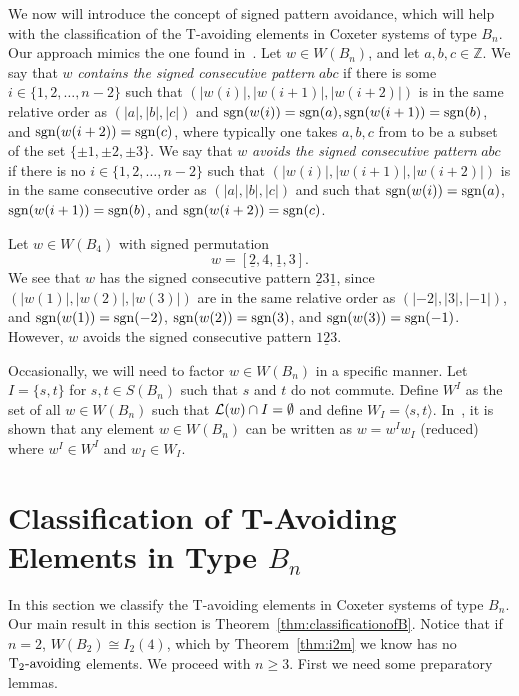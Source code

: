 We now will introduce the concept of signed pattern avoidance, which will help with the classification of the T-avoiding elements in Coxeter systems of type $B_n$. Our approach mimics the one found in~\cite{Gern2013a}. Let $w \in W(B_n)$, and let $a,b,c \in \mathbb{Z}$. We say that $w$ \emph{contains the signed consecutive pattern} $abc$ if there is some $i \in \{1,2, \ldots, n-2\}$ such that $(|w(i)|,|w(i+1)|,|w(i+2)|)$ is in the same relative order as $(|a|,|b|,|c|)$ and $\mathrm{sgn}(w(i))=\mathrm{sgn}(a), \mathrm{sgn}(w(i+1))=\mathrm{sgn}(b)$, and $\mathrm{sgn}(w(i+2))=\mathrm{sgn}(c)$, where typically one takes $a,b,c$ from to be a subset of the set $\{\pm1,\pm2,\pm3\}$. We say that $w$ \emph{avoids the signed consecutive pattern} $abc$ if there is no $i \in \{1,2, \ldots, n-2\}$ such that $\left(|w(i)|, |w(i+1)|, |w(i+2)|\right)$ is in the same consecutive order as $\left(|a|, |b|, |c| \right)$ and such that $\mathrm{sgn}(w(i))=\mathrm{sgn}(a)$, $\mathrm{sgn}(w(i+1))=\mathrm{sgn}(b)$, and $\mathrm{sgn}(w(i+2))=\mathrm{sgn}(c)$.

\begin{example}
Let $w \in W(B_4)$ with signed permutation \[w=[\underline{2},4, \underline{1}, 3].\] We see that $w$ has the signed consecutive pattern $\underline{2} 3 \underline{1}$, since $(|w(1)|, |w(2)|, |w(3)|)$ are in the same relative order as $(|-2|, |3|, |-1|)$, and $\mathrm{sgn}(w(1))=\mathrm{sgn}(-2)$, $\mathrm{sgn}(w(2))=\mathrm{sgn}(3)$, and $\mathrm{sgn}(w(3))=\mathrm{sgn}(-1)$. However, $w$ avoids the signed consecutive pattern $1\underline{2}3$.
\end{example}

Occasionally, we will need to factor $w \in W(B_n)$ in a specific manner. Let $I=\{s,t\}$ for $s, t \in S(B_n)$ such that $s$ and $t$ do not commute. Define $W^I$ as the set of all $w \in W(B_n)$ such that $\mathcal{L}(w) \cap I= \emptyset$ and define $W_I=\langle s,t \rangle$. In~\cite{Humphreys1990}, it is shown that any element $w \in W(B_n)$ can be written as $w=w^Iw_I$ (reduced) where $w^I \in W^I$ and $w_I \in W_I$.

\section{Classification of T-Avoiding Elements in Type $B_n$}\label{sec:TAB}


In this section we classify the T-avoiding elements in Coxeter systems of type $B_n$. Our main result in this section is Theorem~\ref{thm:classificationofB}. Notice that if $n=2$, $W(B_2) \cong I_2(4)$, which by Theorem~\ref{thm:i2m} we know has no $\operatorname{T_2-\mathrm{avoiding}}$ elements. We proceed with $n \geq 3$. First we need some preparatory lemmas. 

